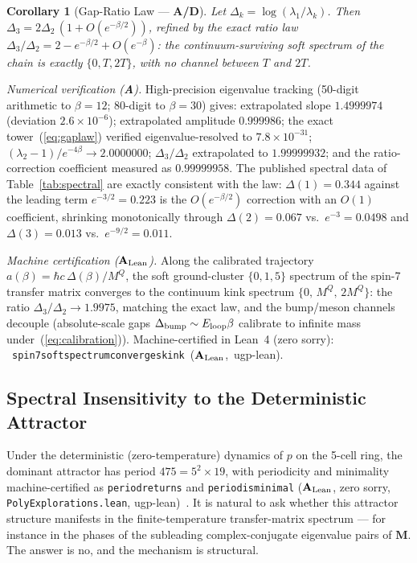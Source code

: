 \documentclass[11pt]{article}
\newtheorem{corollary}[theorem]{Corollary}
\theoremstyle{remark}
\newcommand{\lean}[1]{%
  \penalty-100
  \begingroup\def\_{\textunderscore\allowbreak}\texttt{#1}\endgroup}
\newcommand{\CatA}{\textbf{A}}
\newcommand{\CatAL}{\ensuremath{\textbf{A}_{\rm Lean}}}
\newcommand{\CatAD}{\textbf{A/D}}
\begin{document}
\begin{corollary}[Gap-Ratio Law --- \CatAD{}]
\label{cor:gapratio}
Let $\Delta_k = \log(\lambda_1/\lambda_k)$. Then
$\Delta_3 = 2\Delta_2\,(1 + O(e^{-\beta/2}))$, refined by the exact ratio law
$\Delta_3/\Delta_2 = 2 - e^{-\beta/2} + O(e^{-\beta})$: the
continuum-surviving soft spectrum of the chain is exactly $\{0, T, 2T\}$,
with no channel between $T$ and $2T$.
\end{corollary}

\noindent\emph{Numerical verification (\CatA{}).}
High-precision eigenvalue tracking (50-digit arithmetic to $\beta = 12$;
80-digit to $\beta = 30$) gives: extrapolated slope $1.4999974$ (deviation
$2.6 \times 10^{-6}$); extrapolated amplitude $0.999986$; the exact
tower~(\ref{eq:gaplaw}) verified eigenvalue-resolved to $7.8 \times 10^{-31}$;
$(\lambda_2 - 1)/e^{-4\beta} \to 2.0000000$; $\Delta_3/\Delta_2$ extrapolated
to $1.99999932$; and the ratio-correction coefficient measured as
$0.99999958$. The published spectral data of Table~\ref{tab:spectral} are
exactly consistent with the law: $\Delta(1) = 0.344$ against the leading term
$e^{-3/2} = 0.223$ is the $O(e^{-\beta/2})$ correction with an $O(1)$
coefficient, shrinking monotonically through $\Delta(2) = 0.067$ vs.\
$e^{-3} = 0.0498$ and $\Delta(3) = 0.013$ vs.\ $e^{-9/2} = 0.011$.

\medskip
\noindent\emph{Machine certification (\CatAL{}).}
Along the calibrated trajectory $a(\beta) = \hbar c\,\Delta(\beta)/M^Q$,
the soft ground-cluster $\{0,1,5\}$ spectrum of the spin-7 transfer matrix
converges to the continuum kink spectrum $\{0,\,M^Q,\,2M^Q\}$:
the ratio $\Delta_3/\Delta_2 \to 1.9975$, matching the exact law, and the
bump/meson channels decouple (absolute-scale gaps $\Delta_{\rm bump} \sim
E_{\rm loop}\beta$ calibrate to infinite mass
under~(\ref{eq:calibration})).
Machine-certified in Lean~4 (zero sorry):
\mbox{\lean{spin7\_soft\_spectrum\_converges\_kink} (\CatAL{}, ugp-lean)}.

\subsection{Spectral Insensitivity to the Deterministic Attractor}
\label{sec:insensitivity}

Under the deterministic (zero-temperature) dynamics of $p$ on the 5-cell
ring, the dominant attractor has period $475 = 5^2 \times 19$, with
periodicity and minimality machine-certified as \lean{period\_475\_returns}
and \lean{period\_475\_is\_minimal} (\CatAL{}, zero sorry,
\texttt{PolyExplorations.lean}, ugp-lean)~\cite{SpivackGTEPolynomialWolfram}.
It is natural to ask whether this attractor structure manifests in the
finite-temperature transfer-matrix spectrum --- for instance in the phases of
the subleading complex-conjugate eigenvalue pairs of $\mathbf{M}$. The answer
is no, and the mechanism is structural.
\end{document}
